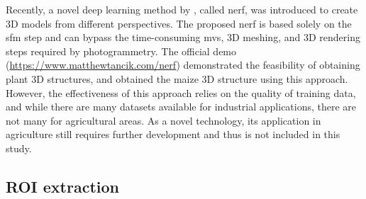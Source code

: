 

Recently, a novel deep learning method by \citet{mildenhall_nerf_2022}, called \gls{nerf}, was introduced to create 3D models from different perspectives. The proposed \gls{nerf} is based solely on the \gls{sfm} step and can bypass the time-consuming \gls{mvs}, 3D meshing, and 3D rendering steps required by photogrammetry. The official demo (\url{https://www.matthewtancik.com/nerf}) demonstrated the feasibility of obtaining plant 3D structures, and \citet{jignasu_plant_2023} obtained the maize 3D structure using this approach. However, the effectiveness of this approach relies on the quality of training data, and while there are many datasets available for industrial applications, there are not many for agricultural areas. As a novel technology, its application in agriculture still requires further development and thus is not included in this study.



\subsection{ROI extraction}


